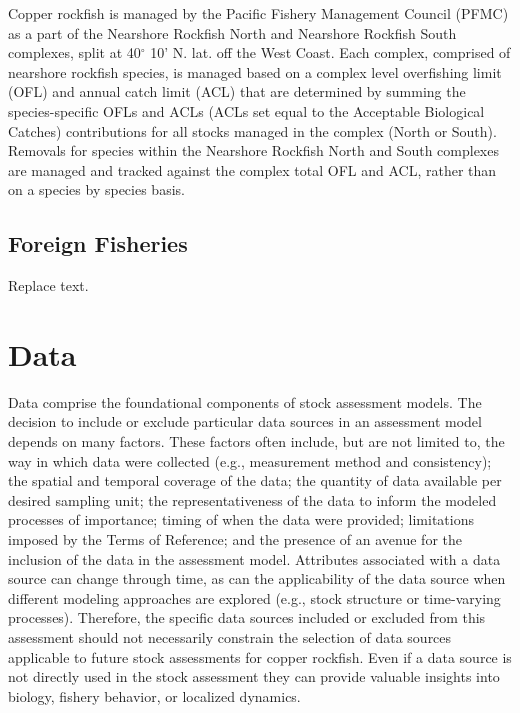 \documentclass[11pt,
  english,
  letterpaper,
]{article}
\begin{document}
Copper rockfish is managed by the Pacific Fishery Management Council (PFMC) as a part of the Nearshore Rockfish North and Nearshore Rockfish South complexes, split at 40\(^\circ\) 10' N. lat. off the West Coast. Each complex, comprised of nearshore rockfish species, is managed based on a complex level overfishing limit (OFL) and annual catch limit (ACL) that are determined by summing the species-specific OFLs and ACLs (ACLs set equal to the Acceptable Biological Catches) contributions for all stocks managed in the complex (North or South). Removals for species within the Nearshore Rockfish North and South complexes are managed and tracked against the complex total OFL and ACL, rather than on a species by species basis.

\hypertarget{foreign-fisheries}{%
\subsection{Foreign Fisheries}\label{foreign-fisheries}}

Replace text.

\hypertarget{data}{%
\section{Data}\label{data}}

Data comprise the foundational components of stock assessment models. The decision to include or exclude particular data sources in an assessment model depends on many factors. These factors often include, but are not limited to, the way in which data were collected (e.g., measurement method and consistency); the spatial and temporal coverage of the data; the quantity of data available per desired sampling unit; the representativeness of the data to inform the modeled processes of importance; timing of when the data were provided; limitations imposed by the Terms of Reference; and the presence of an avenue for the inclusion of the data in the assessment model. Attributes associated with a data source can change through time, as can the applicability of the data source when different modeling approaches are explored (e.g., stock structure or time-varying processes). Therefore, the specific data sources included or excluded from this assessment should not necessarily constrain the selection of data sources applicable to future stock assessments for copper rockfish. Even if a data source is not directly used in the stock assessment they can provide valuable insights into biology, fishery behavior, or localized dynamics.
\end{document}
